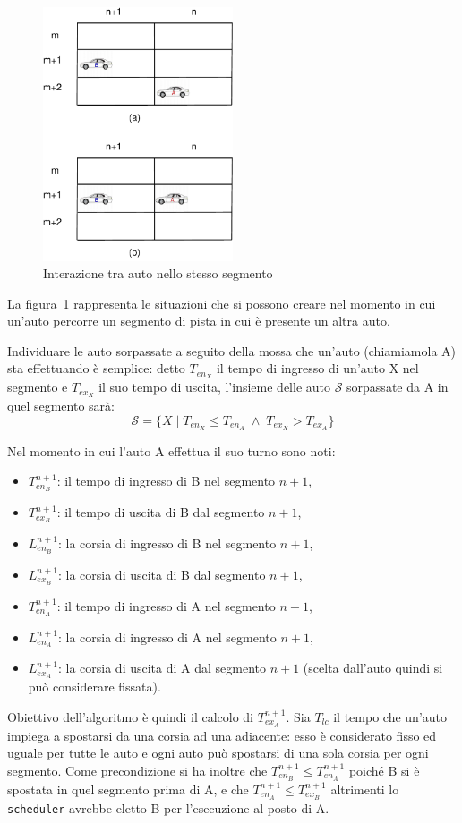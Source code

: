 \documentclass[11pt,a4paper]{report}
\begin{document}
\begin{figure}
\begin{center}
\includegraphics[width=0.5\textwidth]{diagrammi/Surpass}
\caption{Interazione tra auto nello stesso segmento}
\label{fig:surpass}
\end{center}
\end{figure}
La figura~\ref{fig:surpass} rappresenta le situazioni che si possono creare nel momento in cui un'auto percorre un segmento di pista in cui è presente un altra auto.

Individuare le auto sorpassate a seguito della mossa che un'auto (chiamiamola A) sta effettuando è semplice: detto $T_{en_X}$ il tempo di ingresso di un'auto X nel segmento e $T_{ex_X}$ il suo tempo di uscita, l'insieme delle auto $\mathcal{S}$ sorpassate da A in quel segmento sarà:
\[ \mathcal{S} = \{ X \mid T_{en_X} \leq T_{en_A} \;\wedge\; T_{ex_X} > T_{ex_A}\} \]

Nel momento in cui l'auto A effettua il suo turno sono noti:
\begin{itemize}
\item $T_{en_B}^{n+1}$: il tempo di ingresso di B nel segmento $n+1$,
\item $T_{ex_B}^{n+1}$: il tempo di uscita di B dal segmento $n+1$,
\item $L_{en_B}^{n+1}$: la corsia di ingresso di B nel segmento $n+1$,
\item $L_{ex_B}^{n+1}$: la corsia di uscita di B dal segmento $n+1$,
\item $T_{en_A}^{n+1}$: il tempo di ingresso di A nel segmento $n+1$,
\item $L_{en_A}^{n+1}$: la corsia di ingresso di A nel segmento $n+1$,
\item $L_{ex_A}^{n+1}$: la corsia di uscita di A dal segmento $n+1$ (scelta dall'auto quindi si può considerare fissata).
\end{itemize}
Obiettivo dell'algoritmo è quindi il calcolo di $T_{ex_A}^{n+1}$. Sia $T_{lc}$ il tempo che un'auto impiega a spostarsi da una corsia ad una adiacente: esso è considerato fisso ed uguale per tutte le auto e ogni auto può spostarsi di una sola corsia per ogni segmento.
Come precondizione si ha inoltre che $T_{en_B}^{n+1} \leq T_{en_A}^{n+1}$ poiché B si è spostata in quel segmento prima di A, e che $T_{en_A}^{n+1} \leq T_{ex_B}^{n+1}$ altrimenti lo \texttt{scheduler} avrebbe eletto B per l'esecuzione al posto di A.
\end{document}
